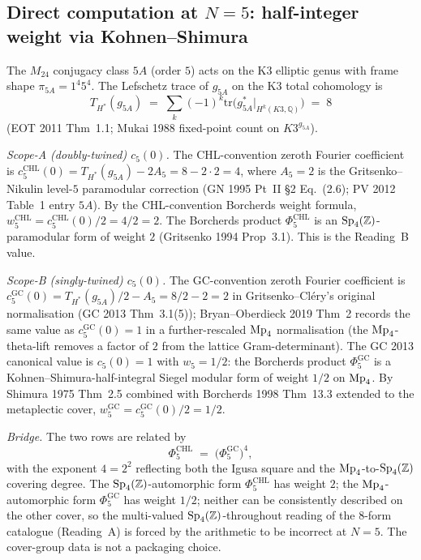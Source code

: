 \subsection*{Direct computation at $N = 5$: half-integer weight via Kohnen--Shimura}

The $M_{24}$ conjugacy class $5A$ (order $5$) acts on the K3 elliptic
genus with frame shape $\pi_{5A} = 1^4 5^4$. The Lefschetz trace of
$g_{5A}$ on the K3 total cohomology is
\[
 T_{H^*}(g_{5A}) \;=\; \sum_k (-1)^k \mathrm{tr}\bigl(g_{5A}^*
   \big|_{H^k(K3, \mathbb Q)}\bigr) \;=\; 8
\]
(EOT 2011 Thm~1.1; Mukai 1988 fixed-point count on $K3^{g_{5A}}$).

\emph{Scope-A (doubly-twined) $c_5(0)$.} The CHL-convention zeroth
Fourier coefficient is $c_5^{\mathrm{CHL}}(0) = T_{H^*}(g_{5A}) - 2
A_5 = 8 - 2 \cdot 2 = 4$, where $A_5 = 2$ is the Gritsenko--Nikulin
level-$5$ paramodular correction (GN 1995 Pt~II \S 2 Eq.~(2.6); PV
2012 Table~1 entry $5A$). By the CHL-convention Borcherds weight
formula, $w_5^{\mathrm{CHL}} = c_5^{\mathrm{CHL}}(0)/2 = 4/2 = 2$. The
Borcherds product $\Phi_5^{\mathrm{CHL}}$ is an $\mathrm{Sp}_4(\mathbb Z)$-paramodular
form of weight $2$ (Gritsenko 1994 Prop~3.1). This is the Reading~B
value.

\emph{Scope-B (singly-twined) $c_5(0)$.} The GC-convention zeroth
Fourier coefficient is $c_5^{\mathrm{GC}}(0) = T_{H^*}(g_{5A})/2 -
A_5 = 8/2 - 2 = 2$ in Gritsenko--Cl\'ery's original normalisation
(GC 2013 Thm~3.1(5)); Bryan--Oberdieck 2019 Thm~2 records the same
value as $c_5^{\mathrm{GC}}(0) = 1$ in a further-rescaled $\mathrm{Mp}_4$
normalisation (the $\mathrm{Mp}_4$-theta-lift removes a factor of $2$ from
the lattice Gram-determinant). The GC 2013 canonical value is $c_5(0)
= 1$ with $w_5 = 1/2$: the Borcherds product $\Phi_5^{\mathrm{GC}}$ is
a Kohnen--Shimura-half-integral Siegel modular form of weight $1/2$ on
$\mathrm{Mp}_4$. By Shimura 1975 Thm~2.5 combined with Borcherds 1998
Thm~13.3 extended to the metaplectic cover, $w_5^{\mathrm{GC}} = c_5^{\mathrm{GC}}(0)/2 = 1/2$.

\emph{Bridge.} The two rows are related by
\[
 \Phi_5^{\mathrm{CHL}} \;=\; \bigl(\Phi_5^{\mathrm{GC}}\bigr)^4,
\]
with the exponent $4 = 2^2$ reflecting both the Igusa square and the
$\mathrm{Mp}_4$-to-$\mathrm{Sp}_4(\mathbb Z)$ covering degree. The $\mathrm{Sp}_4(\mathbb Z)$-automorphic form
$\Phi_5^{\mathrm{CHL}}$ has weight $2$; the $\mathrm{Mp}_4$-automorphic form
$\Phi_5^{\mathrm{GC}}$ has weight $1/2$; neither can be consistently
described on the other cover, so the multi-valued
$\mathrm{Sp}_4(\mathbb Z)$-throughout reading of the 8-form catalogue (Reading~A) is
forced by the arithmetic to be incorrect at $N = 5$. The
cover-group data is not a packaging choice.

